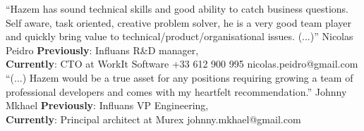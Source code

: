 %
%
%

\twocolumnsection
{
        {“Hazem has sound technical skills and good ability to catch business questions. Self aware, task oriented, creative problem solver, he is a very good team player and quickly bring value to technical/product/organisational issues. (...)”}
        {Nicolas Peidro}
        {\textbf{Previously}: Influans R\&D manager, \\ \textbf{Currently}: CTO at WorkIt Software}
	    {+33 612 900 995}
	    {nicolas.peidro@gmail.com}
}
{
        {“(...) Hazem would be a true asset for any positions requiring growing a team of professional developers and comes with my heartfelt recommendation.”}  
        {Johnny Mkhael}
    	{\textbf{Previously}: Influans VP Engineering, \\ \textbf{Currently}: Principal architect at Murex}
    	{johnny.mkhael@gmail.com}
        {}
}